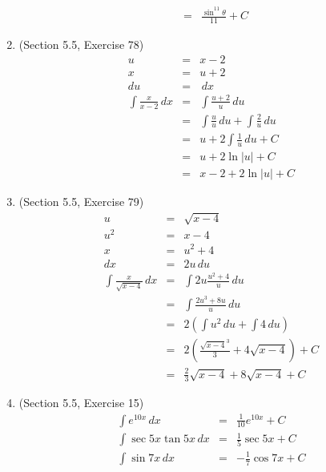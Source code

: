 \documentclass{article}
\begin{document}
\begin{enumerate}
\begin{eqnarray}
                                                         &=& \frac{\sin^{11}{\theta}}{11} + C
        \end{eqnarray}
    \item (Section 5.5, Exercise 78)
        \begin{eqnarray}
            u &=& x - 2 \\
            x &=& u + 2 \\
            du &=& \,dx \\
            \int{\frac{x}{x - 2}\,dx} &=& \int{\frac{u + 2}{u}\,du} \\
                                      &=& \int{\frac{u}{u}\,du} + \int{\frac{2}{u}\,du} \\
                                      &=& u + 2\int{\frac{1}{u}\,du} + C \\
                                      &=& u + 2\ln{|u|} + C \\
                                      &=& x - 2 + 2\ln{|u|} + C
        \end{eqnarray}
    \item (Section 5.5, Exercise 79)
        \begin{eqnarray}
            u &=& \sqrt{x - 4} \\
            u^2 &=& x - 4 \\
            x &=& u^2 + 4 \\
            dx &=& 2u\,du \\
            \int{\frac{x}{\sqrt{x - 4}}\,dx} &=& \int{2u\frac{u^2 + 4}{u}\,du} \\
                                             &=& \int{\frac{2u^3 + 8u}{u}\,du} \\
                                             &=& 2\left(\int{u^2\,du} + \int{4\,du}\right) \\
                                             &=& 2\left(\frac{\sqrt{x - 4}^3}{3} + 4\sqrt{x - 4}\right) + C \\
                                             &=& \frac{2}{3}\sqrt{x - 4} + 8\sqrt{x - 4} + C
        \end{eqnarray}
    \item (Section 5.5, Exercise 15)
        \begin{eqnarray}
            \int{e^{10x}\,dx} &=& \frac{1}{10}e^{10x} + C \\
            \int{\sec{5x}\tan{5x}\,dx} &=& \frac{1}{5}\sec{5x} + C \\
            \int{\sin{7x}\,dx} &=& -\frac{1}{7}\cos{7x} + C \\

\end{eqnarray}
\end{enumerate}
\end{document}
